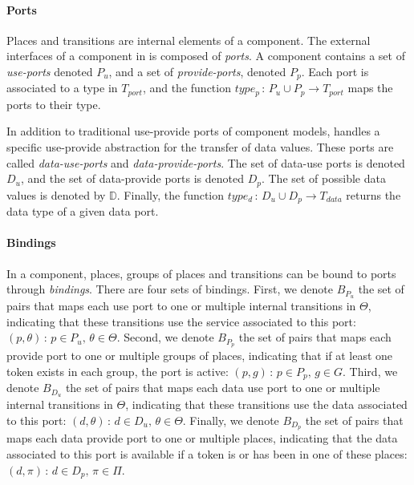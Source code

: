 \paragraph{Ports}{

Places and transitions are internal elements of a \mad component.
The external interfaces of a component in \mad is
composed of \emph{ports}. A component contains a set of \emph{use-ports}
denoted $P_{u}$, and a set of \emph{provide-ports}, denoted
$P_{p}$. Each port is associated to a type in $T_{port}$, and the
function $type_{p}\,:\,P_{u}\cup P_{p}\rightarrow T_{port}$ maps the ports
to their type. 

In addition to traditional use-provide ports of component models,
\mad handles a specific use-provide abstraction for the
transfer of data values. These ports are called \emph{data-use-ports}
and \emph{data-provide-ports}. The set of data-use ports is denoted
$D_{u}$, and the set of data-provide ports is denoted
$D_{p}$. The set of possible data values is denoted
by $\mathbb{D}$. Finally, the function $type_{d}\,:\,D_{u}\cup
D_{p}\rightarrow T_{data}$ returns the data type of a given data port.
  
}

\paragraph{Bindings}{

In a \mad component, places, groups of places and transitions can be
bound to ports through \emph{bindings}. There are four sets of bindings.
First, we denote $B_{P_{u}}$ the set of pairs that maps
each use port to one or multiple internal transitions in $\Theta$, indicating
that these transitions use the service associated to this port: 
$\left(p,\theta\right)\,:\,p\in P_{u},\,\theta\in\Theta$. Second, we
denote $B_{P_{p}}$ the set of pairs that maps each provide port to one or
multiple groups of places, indicating that if at least one token exists in each
group, the port is active: $\left(p,g\right)\,:\,p\in
P_{p},\,g\in G$. Third, we denote $B_{D_{u}}$ the set of pairs that
maps each data use port to one or multiple internal transitions in $\Theta$,
indicating that these transitions use the data associated to this port: 
$\left(d,\theta\right)\,:\,d\in D_{u},\,\theta\in\Theta$. Finally, we
denote $B_{D_{p}}$ the set of pairs that maps each data provide port to
one or multiple places, indicating that the data associated to this port is
available if a token is or has been in one of these places: $\left(d,\pi\right)\,:\,d\in
D_{p},\,\pi\in \Pi$. 
}

